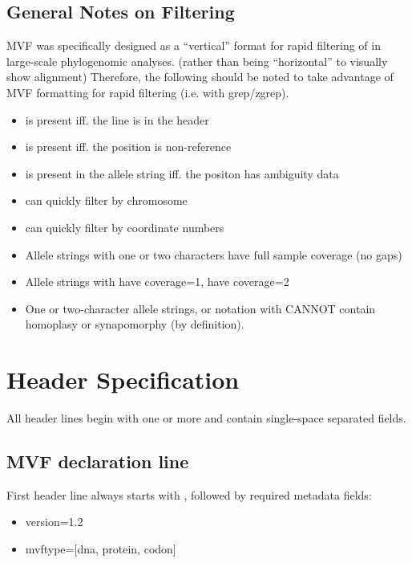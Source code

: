 \documentclass[letterpaper,11pt,english]{sphinxmanual}
\begin{document}
\subsection{General Notes on Filtering}
\label{\detokenize{mvf_spec:general-notes-on-filtering}}
MVF was specifically designed as a “vertical” format for rapid filtering of  in large-scale phylogenomic analyses. (rather than being “horizontal” to visually show alignment) Therefore, the following should be noted to take advantage of MVF formatting for rapid filtering (i.e. with grep/zgrep).
\begin{itemize}
\item {} 
\sphinxcode{\#} is present iff. the line is in the header

\item {} 
 is present iff. the position is non-reference

\item {} 
 is present in the allele string iff. the positon has ambiguity data

\item {} 
\sphinxcode{\#:} can quickly filter by chromosome

\item {} 
\sphinxcode{:\#} can quickly filter by coordinate numbers

\item {} 
Allele strings with one or two characters have full sample coverage (no gaps)

\item {} 
Allele strings with  have coverage=1, \sphinxcode{{[}not@{]}{[}any{]}+} have coverage=2

\item {} 
One or two-character allele strings, or notation with \sphinxcode{{[}any{]}+} CANNOT contain homoplasy or synapomorphy (by definition).

\end{itemize}


\section{Header Specification}
\label{\detokenize{mvf_spec:header-specification}}
All header lines begin with one or more \sphinxcode{\#} and contain single-space separated fields.


\subsection{MVF declaration line}
\label{\detokenize{mvf_spec:mvf-declaration-line}}
First header line always starts with , followed by required metadata fields:
\begin{itemize}
\item {} 
version=1.2

\item {} 
mvftype={[}dna, protein, codon{]}

\end{itemize}
\end{document}
